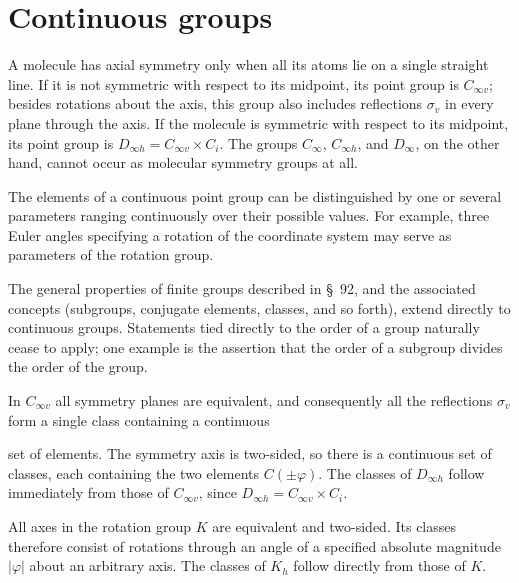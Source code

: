 \section{Continuous groups}



A molecule has axial symmetry only when all its atoms lie on a single straight line. If it is not symmetric with respect to its midpoint, its point group is $C_{\infty v}$; besides rotations about the axis, this group also includes reflections $\sigma_v$ in every plane through the axis. If the molecule is symmetric with respect to its midpoint, its point group is $D_{\infty h}=C_{\infty v}\times C_i$. The groups $C_\infty$, $C_{\infty h}$, and $D_\infty$, on the other hand, cannot occur as molecular symmetry groups at all.



The elements of a continuous point group can be distinguished by one or several parameters ranging continuously over their possible values. For example, three Euler angles specifying a rotation of the coordinate system may serve as parameters of the rotation group.

The general properties of finite groups described in §~92, and the associated concepts (subgroups, conjugate elements, classes, and so forth), extend directly to continuous groups. Statements tied directly to the order of a group naturally cease to apply; one example is the assertion that the order of a subgroup divides the order of the group.

In $C_{\infty v}$ all symmetry planes are equivalent, and consequently all the reflections $\sigma_v$ form a single class containing a continuous

set of elements. The symmetry axis is two-sided, so there is a continuous set of classes, each containing the two elements $C(\pm\varphi)$. The classes of $D_{\infty h}$ follow immediately from those of $C_{\infty v}$, since $D_{\infty h}=C_{\infty v}\times C_i$.

All axes in the rotation group $K$ are equivalent and two-sided. Its classes therefore consist of rotations through an angle of a specified absolute magnitude $|\varphi|$ about an arbitrary axis. The classes of $K_h$ follow directly from those of $K$.

